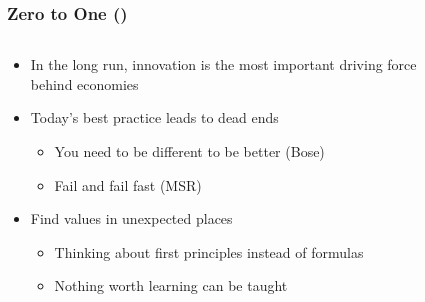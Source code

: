 \documentclass[aspectratio=169,xcolor=x11names,table]{beamer}
\begin{document}
\begin{frame}
	\frametitle{Zero to One (\cite{thiel2014zero})}
	\begin{columns}
		\begin{column}{0.7\linewidth}
			\begin{itemize}
				\item In the long run, innovation is the most important driving force behind economies
					\vspace{8mm}
				\item Today's best practice leads to dead ends
					\begin{itemize}
						\item You need to be different to be better (Bose)
						\item Fail and fail fast (MSR)
					\end{itemize}
					\vspace{8mm}
				\item Find values in unexpected places
					\begin{itemize}
						\item Thinking about first principles instead of formulas
						\item Nothing worth learning can be taught
					\end{itemize}
			\end{itemize}
		\end{column}
		\hfill
		\begin{column}{0.3\linewidth}
			\begin{figure}
				\centering

\end{figure}
\end{column}
\end{columns}
\end{frame}
\end{document}
